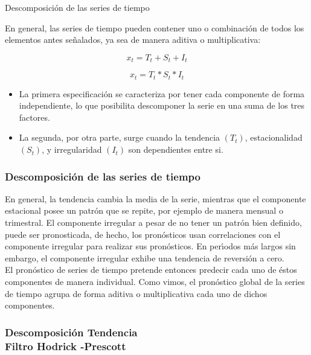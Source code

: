 \documentclass[xcolor=(list of options)]{beamer}
\begin{document}
\begin{section}{Descomposici\'on de las series de tiempo}
\begin{frame}
En general, las series de tiempo pueden contener uno o combinaci\'on de todos los elementos antes se\~nalados, ya sea de manera aditiva o multiplicativa:

\begin{equation*}
x_t = T_t + S_t + I_t
\end{equation*}

\begin{equation*}
x_t = T_t * S_t * I_t
\end{equation*}

\begin{itemize}
\item La primera especificaci\'on se caracteriza por tener cada componente de forma independiente, lo que posibilita descomponer la serie en una suma de los tres factores.
\item  La segunda, por otra parte, surge cuando la tendencia $(T_t)$, estacionalidad $(S_t)$, y irregularidad $(I_t)$ son dependientes entre si.
\end{itemize}

\end{frame}

\begin{frame}
\frametitle{Descomposici\'on de las series de tiempo}

En general, la tendencia cambia la media de la serie, mientras que el componente estacional posee un patr\'on que se repite, por ejemplo de manera mensual o trimestral. El componente irregular a pesar de no tener un patr\'on bien definido, puede ser pronosticada, de hecho, los pron\'osticos usan correlaciones con el componente irregular para realizar sus pron\'osticos. En per\'\i{}odos m\'as largos sin embargo, el componente irregular exhibe una tendencia de reversi\'on a cero.\\
El pron\'ostico de series de tiempo pretende entonces predecir cada uno de \'estos componentes de manera individual. Como vimos, el pron\'ostico global de la series de tiempo agrupa de forma aditiva o multiplicativa cada uno de dichos componentes.

\end{frame}

\begin{frame}
\frametitle{Descomposici\'on Tendencia\\
Filtro Hodrick -Prescott}


\end{frame}
\end{section}
\end{document}

